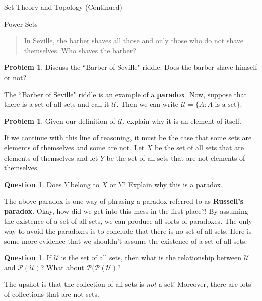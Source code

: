 \documentclass[11pt]{article}
\theoremstyle{definition}
\newtheorem{problem}[theorem]{Problem}
\newtheorem{question}[theorem]{Question}
\begin{document}
\begin{section}{Set Theory and Topology (Continued)}
\begin{subsection}{Power Sets}
\begin{quote}
In Seville, the barber shaves all those and only those who do not shave themselves.  Who shaves the barber?
\end{quote}

\begin{problem}
Discuss the ``Barber of Seville" riddle.  Does the barber shave himself or not?
\end{problem}

The ``Barber of Seville" riddle is an example of a \textbf{paradox}.  Now, suppose that there is a set of all sets and call it $\mathcal{U}$.  Then we can write $\mathcal{U}=\{A:A\mbox{ is a set}\}$.

\begin{problem}
Given our definition of $\mathcal{U}$, explain why it is an element of itself.
\end{problem}

If we continue with this line of reasoning, it must be the case that some sets are elements of themselves and some are not.  Let $X$ be the set of all sets that are elements of themselves and let $Y$ be the set of all sets that are not elements of themselves.

\begin{question}
Does $Y$ belong to $X$ or $Y$?  Explain why this is a paradox.
\end{question}

The above paradox is one way of phrasing a paradox referred to as \textbf{Russell's paradox}.  Okay, how did we get into this mess in the first place?!  By assuming the existence of a set of all sets, we can produce all sorts of paradoxes.  The only way to avoid the paradoxes is to conclude that there is no set of all sets.  Here is some more evidence that we shouldn't assume the existence of a set of all sets.

\begin{question}
If $\mathcal{U}$ is the set of all sets, then what is the relationship between $\mathcal{U}$ and $\mathcal{P}(\mathcal{U})$?  What about $\mathcal{P}(\mathcal{P}(\mathcal{U})$?
\end{question}

The upshot is that the collection of all sets is \emph{not} a set!  Moreover, there are lots of collections that are not sets.

\end{subsection}

\end{section}
\end{document}
